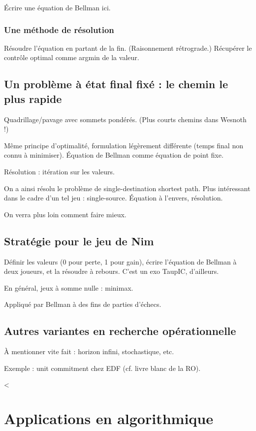 \documentclass[a4paper, 11pt]{article}
\begin{document}
Écrire une équation de Bellman ici.

\subsubsection{Une méthode de résolution}

Résoudre l'équation en partant de la fin.
(Raisonnement rétrograde.)
Récupérer le contrôle optimal comme argmin de la valeur.

\subsection{Un problème à état final fixé : le chemin le plus rapide}

Quadrillage/pavage avec sommets pondérés. (Plus courts chemins dans Wesnoth !)

Même principe d'optimalité, formulation légèrement différente (temps final non
connu à minimiser). Équation de Bellman comme équation de point fixe.

Résolution : itération sur les valeurs.

On a ainsi résolu le problème de single-destination shortest path. Plus
intéressant dans le cadre d'un tel jeu : single-source. Équation à l'envers,
résolution.

On verra plus loin comment faire mieux.

\subsection{Stratégie pour le jeu de Nim}

Définir les valeurs (0 pour perte, 1 pour gain), écrire l'équation de Bellman à
deux joueurs, et la résoudre à rebours. C'est un exo TaupIC, d'ailleurs.

En général, jeux à somme nulle : minimax.

Appliqué par Bellman à des fins de parties d'échecs.

\subsection{Autres variantes en recherche opérationnelle}

À mentionner vite fait : horizon infini, stochastique, etc.

Exemple : unit commitment chez EDF (cf. livre blanc de la RO).


<\section{Applications en algorithmique}
\end{document}
